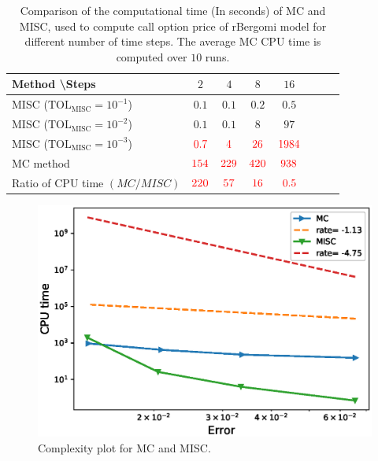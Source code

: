 \FloatBarrier
\begin{table}[h!]
	\centering
	\begin{tabular}{l*{6}{c}r}
		Method \textbackslash  Steps            & $2$ & $4$ & $8$ & $16$ &   \\
		\hline
		MISC ($\text{TOL}_{\text{MISC}}=10^{-1}$)  & $0.1$ & $0.1$ & $0.2$ & $0.5$ \\
		MISC ($\text{TOL}_{\text{MISC}}=10^{-2}$)  & $0.1$ & $0.1$ & $8$ & $97$ \\
		MISC ($\text{TOL}_{\text{MISC}}=10^{-3}$)  & $\red{0.7}$ & $\red{4}$ & $\red{26}$ & $\red{1984}$ \\
		\hline
		MC method   & $ \red{154}
		
		$  & $  \red{229}$  & $  \red{420}$ & $ \red{938}
		$  \\	
		\hline
		Ratio of CPU time  $\left(MC/MISC \right)$ & $ \red{   220}
		
		$  & $  \red{
		 57
		}$  & $  \red{    16
		}$ & $ \red{ 0.5}
		$  \\	
				
		\hline
	\end{tabular}
	\caption{Comparison of the computational time (In seconds) of  MC and MISC, used to compute call option price of rBergomi model for different number of time steps. The average  MC CPU time is computed over $10$ runs. }
	\label{Comparsion of the computational time of  MC and MISC, used to compute Call option price of rBergomi model for different number of time steps. Case set5}
\end{table}

\FloatBarrier


	\begin{figure}[h!]
	\centering
	\includegraphics[width=0.5\linewidth]{./figures/rBergomi_Complexity_rates/set7/error_vs_time_set7}
	
	\caption{Complexity plot for MC and MISC.}
	\label{fig:Complexity plot for MC and MISC for Case set $5$ parameters}
\end{figure}
\FloatBarrier



